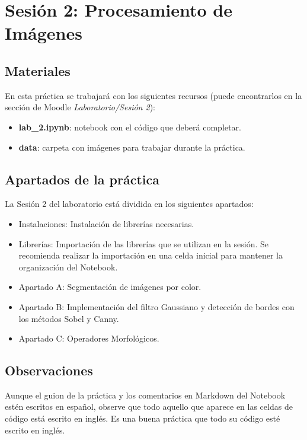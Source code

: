 \chapter{Sesión 2: Procesamiento de Imágenes}
\label{chapter:introduction_ses_2}

\section{Materiales}

En esta práctica se trabajará con los siguientes recursos (puede encontrarlos en la sección de Moodle \textit{Laboratorio/Sesión 2}):

\begin{itemize}
    \item \textbf{lab\_2.ipynb}: notebook con el código que deberá completar.
    \item \textbf{data}: carpeta con imágenes para trabajar durante la práctica.
\end{itemize}

\section{Apartados de la práctica}

La Sesión 2 del laboratorio está dividida en los siguientes apartados:

\begin{itemize}
    \item Instalaciones: Instalación de librerías necesarias.
    \item Librerías: Importación de las librerías que se utilizan en la sesión. Se recomienda realizar la importación en una celda inicial para mantener la organización del Notebook.
    \item Apartado A: Segmentación de imágenes por color.
    \item Apartado B: Implementación del filtro Gaussiano y detección de bordes con los métodos Sobel y Canny.
    \item Apartado C: Operadores Morfológicos.
\end{itemize}

\section{Observaciones}

Aunque el guion de la práctica y los comentarios en Markdown del Notebook estén escritos en español, observe que todo aquello que aparece en las celdas de código está escrito en inglés. Es una buena práctica que todo su código esté escrito en inglés.

